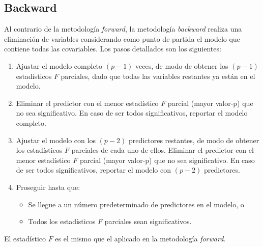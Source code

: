 \documentclass[
  11pt,
]{book}
\providecommand{\tightlist}{%
  \setlength{\itemsep}{0pt}\setlength{\parskip}{0pt}}
\theoremstyle{definition}
\theoremstyle{definition}
\theoremstyle{definition}
\theoremstyle{definition}
\theoremstyle{remark}
\begin{document}
\subsection{Backward}\label{backward}

Al contrario de la metodología \emph{forward}, la metodología \emph{backward} realiza una eliminación de variables considerando como punto de partida el modelo que contiene todas las covariables. Los pasos detallados son los siguientes:

\begin{enumerate}
\def\labelenumi{\arabic{enumi}.}
\tightlist
\item
  Ajustar el modelo completo \((p − 1)\) veces, de modo de obtener los \((p − 1)\) estadísticos \(F\) parciales, dado que todas las variables restantes ya están en el modelo.
\item
  Eliminar el predictor con el menor estadístico \(F\) parcial (mayor valor-p) que no sea significativo. En caso de ser todos significativos, reportar el modelo completo.
\item
  Ajustar el modelo con los \((p − 2)\) predictores restantes, de modo de obtener los estadísticos \(F\) parciales de cada uno de ellos. Eliminar el predictor con el menor estadístico \(F\) parcial (mayor valor-p) que no sea significativo. En caso de ser todos significativos, reportar el modelo con \((p − 2)\) predictores.
\item
  Proseguir hasta que:

  \begin{itemize}
  \tightlist
  \item
    Se llegue a un número predeterminado de predictores en el modelo, o
  \item
    Todos los estadísticos \(F\) parciales sean significativos.
  \end{itemize}
\end{enumerate}

El estadístico \(F\) es el mismo que el aplicado en la metodología \emph{forward}.
\end{document}
